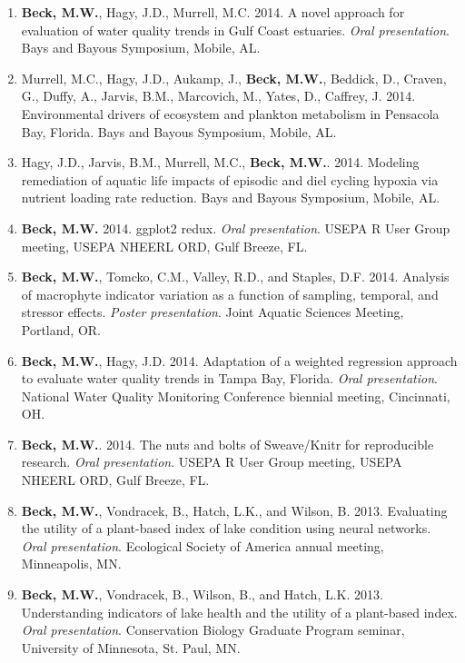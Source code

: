 \documentclass[letterpaper,12pt]{article}
\begin{document}
\begin{enumerate}
\item {\bf Beck, M.W.}, Hagy, J.D., Murrell, M.C. 2014. A novel approach for evaluation of water quality trends in Gulf Coast estuaries. \textit{Oral presentation}. Bays and Bayous Symposium, Mobile, AL.

\item Murrell, M.C., Hagy, J.D., Aukamp, J., {\bf Beck, M.W.}, Beddick, D., Craven, G., Duffy, A., Jarvis, B.M., Marcovich, M., Yates, D., Caffrey, J. 2014. Environmental drivers of ecosystem and plankton metabolism in Pensacola Bay, Florida. Bays and Bayous Symposium, Mobile, AL. 

\item Hagy, J.D., Jarvis, B.M., Murrell, M.C., {\bf Beck, M.W.}. 2014. Modeling remediation of aquatic life impacts of episodic and diel cycling hypoxia via nutrient loading rate reduction. Bays and Bayous Symposium, Mobile, AL. 

\item {\bf Beck, M.W.} 2014. ggplot2 redux. \textit{Oral presentation}. USEPA R User Group meeting, USEPA NHEERL ORD, Gulf Breeze, FL.

\item {\bf Beck, M.W.}, Tomcko, C.M., Valley, R.D., and Staples, D.F. 2014. Analysis of macrophyte indicator variation as a function of sampling, temporal, and stressor effects. \textit{Poster presentation}. Joint Aquatic Sciences Meeting, Portland, OR.

\item {\bf Beck, M.W.}, Hagy, J.D. 2014. Adaptation of a weighted regression approach to evaluate water quality trends in {T}ampa {B}ay, {F}lorida. \textit{Oral presentation}. National Water Quality Monitoring Conference biennial meeting, Cincinnati, OH.

\item {\bf Beck, M.W.}. 2014. The nuts and bolts of Sweave/Knitr for reproducible research. \textit{Oral presentation}. USEPA R User Group meeting, USEPA NHEERL ORD, Gulf Breeze, FL.

\item {\bf Beck, M.W.}, Vondracek, B., Hatch, L.K., and Wilson, B. 2013. Evaluating the utility of a plant-based index of lake condition using neural networks. \textit{Oral presentation}. Ecological Society of America annual meeting, Minneapolis, MN.

\item {\bf Beck, M.W.}, Vondracek, B., Wilson, B., and Hatch, L.K. 2013. Understanding indicators of lake health and the utility of a plant-based index. \textit{Oral presentation}. Conservation Biology Graduate Program seminar, University of Minnesota, St. Paul, MN.


\end{enumerate}
\end{document}
